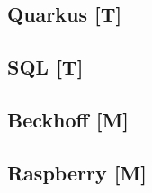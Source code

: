 \begin{spacing}{1}
    \section{Quarkus [T]}\label{section:quarkus}
    \end{spacing}


\begin{spacing}{1}
    \section{SQL [T]}\label{section:sql}
    \end{spacing}


\begin{spacing}{1}
    \section{Beckhoff [M]}\label{section:allTechBeckhoff}
    \end{spacing}

 
\begin{spacing}{1}
    \section{Raspberry [M]}\label{section:allTechRaspberry}
    \end{spacing}

 

